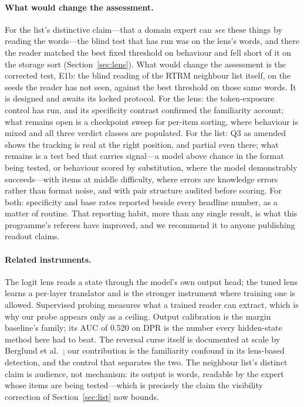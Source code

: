 \documentclass[11pt]{article}
\begin{document}
\paragraph{What would change the assessment.} For the list's distinctive claim---that a domain expert can \emph{see} these things by reading the words---the blind test that has run was on the lens's words, and there the reader matched the best fixed threshold on behaviour and fell short of it on the storage sort (Section~\ref{sec:lens}). What would change the assessment is the corrected test, E1b: the blind reading of the RTRM neighbour list itself, on the seeds the reader has not seen, against the best threshold on those same words. It is designed and awaits its locked protocol. For the lens: the token-exposure control has run, and its specificity contrast confirmed the familiarity account; what remains open is a checkpoint sweep for per-item sorting, where behaviour is mixed and all three verdict classes are populated. For the list: Q3 as amended shows the tracking is real at the right position, and partial even there; what remains is a test bed that carries signal---a model above chance in the format being tested, or behaviour scored by substitution, where the model demonstrably succeeds---with items at middle difficulty, where errors are knowledge errors rather than format noise, and with pair structure audited before scoring. For both: specificity
and base rates reported beside every headline number, as a matter of
routine. That reporting habit, more than any single result, is what
this programme's referees have improved, and we recommend it to anyone
publishing readout claims.

\paragraph{Related instruments.}
The logit lens \cite{logitlens} reads a state through the model's own
output head; the tuned lens \cite{tunedlens} learns a per-layer
translator and is the stronger instrument where training one is
allowed. Supervised probing \cite{alainbengio} measures what a trained
reader can extract, which is why our probe appears only as a ceiling.
Output calibration \cite{guo2017} is the margin baseline's family; its
AUC of 0.520 on DPR is the number every hidden-state method here had
to beat. The reversal curse itself is documented at scale by Berglund
et al.\ \cite{berglund2023}; our contribution is the familiarity confound in its lens-based detection, and the control that separates the two. The neighbour list's distinct claim is audience, not
mechanism: its output is words, readable by the expert whose items are
being tested---which is precisely the claim the visibility correction
of Section~\ref{sec:list} now bounds.
\end{document}
